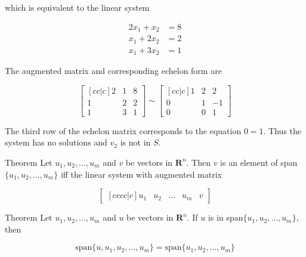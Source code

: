         which is equivalent to the linear system

        \begin{align*}
            2x_1 + x_2  &= 8 \\
            x_1 + 2x_2  &= 2 \\
            x_1 + 3x_2  &= 1
        \end{align*}

        The augmented matrix and corresponding echelon form are

        \[
            \begin{bmatrix}[cc|c]
                2 & 1 & 8 \\
                1 & 2 & 2 \\
                1 & 3 & 1
            \end{bmatrix}
            \sim
            \begin{bmatrix}[cc|c]
                1 & 2 & 2 \\
                0 & 1 & -1 \\
                0 & 0 & 1
            \end{bmatrix}
        \]

        The third row of the echelon matrix corresponds to the equation $0 = 1$. Thus the system has no solutions and $v_2$ is not in $S$.

        \begin{theorem}{Theorem}
            Let $u_1, u_2, \dots, u_m$ and $v$ be vectors in $\mathbf{R}^n$. Then $v$ is an element of span$\{u_1, u_2, \dots, u_m\}$ iff the linear system with augmented matrix

            \[
                \begin{bmatrix}[cccc|c]
                    u_1 & u_2 & \dots & u_m & v
                \end{bmatrix}
            \]
        \end{theorem}

        \begin{theorem}{Theorem}
            Let $u_1, u_2, \dots, u_m$ and $u$ be vectors in $\mathbf{R}^n$. If $u$ is in span$\{u_1, u_2, \dots, u_m\}$, then

            \[
                \text{span}\{u, u_1, u_2, \dots, u_m\} = \text{span}\{u_1, u_2, \dots, u_m\}
            \]
        \end{theorem}

